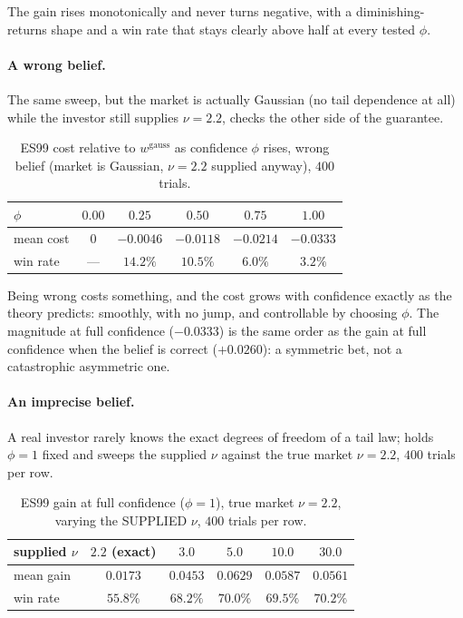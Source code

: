 \documentclass[11pt]{article}
\begin{document}
The gain rises monotonically and never turns negative, with a diminishing-returns
shape and a win rate that stays clearly above half at every tested $\phi$.

\paragraph{A wrong belief.} The same sweep, but the market is actually
Gaussian (no tail dependence at all) while the investor still supplies
$\nu=2.2$, checks the other side of the guarantee.

\begin{table}[h]
\centering
\caption{ES99 cost relative to $w^{\mathrm{gauss}}$ as confidence $\phi$
rises, wrong belief (market is Gaussian, $\nu=2.2$ supplied anyway), $400$
trials.}
\label{tab:tailwrong}
\footnotesize
\begin{tabular}{lccccc}
\toprule
$\phi$ & $0.00$ & $0.25$ & $0.50$ & $0.75$ & $1.00$ \\
\midrule
mean cost & $0$ & $-0.0046$ & $-0.0118$ & $-0.0214$ & $-0.0333$ \\
win rate  & --- & $14.2\%$ & $10.5\%$ & $6.0\%$ & $3.2\%$ \\
\bottomrule
\end{tabular}
\end{table}

Being wrong costs something, and the cost grows with confidence exactly as
the theory predicts: smoothly, with no jump, and controllable by choosing
$\phi$. The magnitude at full confidence ($-0.0333$) is the same order as
the gain at full confidence when the belief is correct ($+0.0260$): a
symmetric bet, not a catastrophic asymmetric one.

\paragraph{An imprecise belief.} A real investor rarely knows the exact
degrees of freedom of a tail law;  holds $\phi=1$ fixed
and sweeps the supplied $\nu$ against the true market $\nu=2.2$, $400$
trials per row.

\begin{table}[h]
\centering
\caption{ES99 gain at full confidence ($\phi=1$), true market $\nu=2.2$,
varying the SUPPLIED $\nu$, $400$ trials per row.}
\label{tab:tailnu}
\footnotesize
\begin{tabular}{lccccc}
\toprule
supplied $\nu$ & $2.2$ (exact) & $3.0$ & $5.0$ & $10.0$ & $30.0$ \\
\midrule
mean gain & $0.0173$ & $0.0453$ & $0.0629$ & $0.0587$ & $0.0561$ \\
win rate  & $55.8\%$ & $68.2\%$ & $70.0\%$ & $69.5\%$ & $70.2\%$ \\
\bottomrule
\end{tabular}
\end{table}
\end{document}
